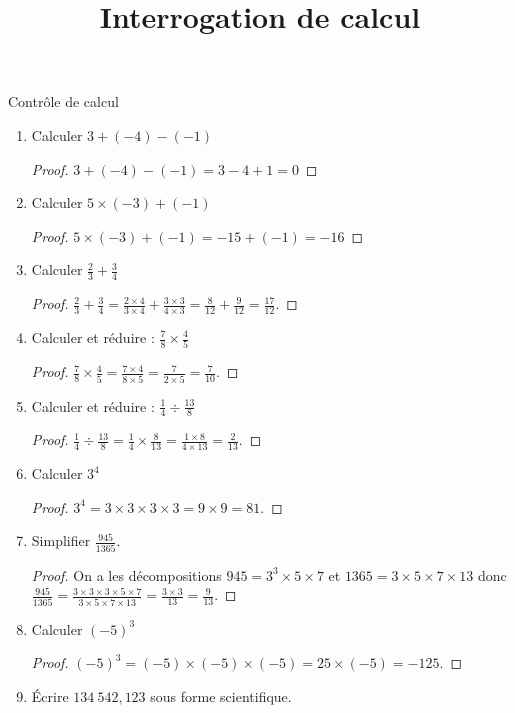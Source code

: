 \documentclass[12 pt]{extarticle}
\title{Interrogation de calcul}
\date{}
\theoremstyle{plain}
\begin{document}
\begin{center}{\Large Contrôle de calcul}\\
 \end{center} 
   \begin{enumerate}
   \item  Calculer $ 3 + (-4) - (-1)$
   \begin{proof}
   $ 3 + (-4) - (-1) = 3 - 4 + 1 = 0$
   \end{proof}
   \item  Calculer $ 5 \times (-3) + (-1) $
   \begin{proof}
   $5 \times (-3)+(-1) = -15 + (-1) = -16$
   \end{proof}
   \item  Calculer $ \frac23 + \frac34$
   \begin{proof}
   $\frac23+\frac34 = \frac{2\times4}{3\times4} + \frac{3\times3}{4\times3} = \frac8{12}+\frac9{12} = \frac{17}{12}$. 
   \end{proof}
   \item  Calculer et réduire : $ \frac78 \times \frac45$
   \begin{proof}
   $\frac78 \times \frac45 = \frac{7\times4}{8\times5} = \frac7{2\times5} = \frac7{10}$.
   \end{proof}
   \item  Calculer et réduire : $\frac 14 \div \frac{13}8$
   \begin{proof}
   $\frac 14 \div \frac{13}8 = \frac14\times\frac8{13} = \frac{1\times8}{4\times13}=\frac{2}{13}.$
   \end{proof}
   \item Calculer $3^4$
   \begin{proof}
   $3^4 = 3 \times 3 \times 3 \times 3 = 9 \times 9 = 81$.
   \end{proof}
   \item Simplifier $\frac{945}{1365}$.\begin{proof}
   On a les décompositions $945 = 3^3\times5\times7$ et $1365 = 3\times 5 \times 7 \times 13$ donc $\frac{945}{1365} = \frac{3\times 3 \times 3\times5\times7}{ 3\times 5 \times 7 \times 13} = \frac{3\times3}{13}=\frac9{13}$.
   \end{proof}
   \item Calculer $(-5)^3$
   \begin{proof}
   $(-5)^3=(-5)\times(-5)\times(-5) = 25 \times (-5) = -125$.
   \end{proof}
   \item Écrire $134~542,123$ sous forme scientifique.

\end{enumerate}
\end{document}
